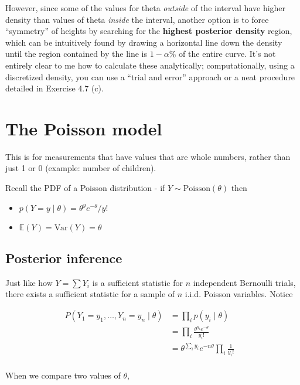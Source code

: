 \documentclass[
]{article}
\providecommand{\tightlist}{%
  \setlength{\itemsep}{0pt}\setlength{\parskip}{0pt}}
\begin{document}
However, since some of the values for theta \emph{outside} of the
interval have higher density than values of theta \emph{inside} the
interval, another option is to force ``symmetry'' of heights by
searching for the \textbf{highest posterior density} region, which can
be intuitively found by drawing a horizontal line down the density until
the region contained by the line is \(1 - \alpha\)\% of the entire
curve. It's not entirely clear to me how to calculate these
analytically; computationally, using a discretized density, you can use
a ``trial and error'' approach or a neat procedure detailed in Exercise
4.7 (c).

\hypertarget{the-poisson-model}{%
\section{The Poisson model}\label{the-poisson-model}}

This is for measurements that have values that are whole numbers, rather
than just 1 or 0 (example: number of children).

Recall the PDF of a Poisson distribution - if
\(Y \sim \text{Poisson}(\theta)\) then

\begin{itemize}
\tightlist
\item
  \(p(Y = y \mid \theta) = \theta^y e^{-\theta} / y!\)
\item
  \(\mathbb{E}(Y) = \text{Var}(Y) = \theta\)
\end{itemize}

\hypertarget{posterior-inference}{%
\subsection{Posterior inference}\label{posterior-inference}}

Just like how \(Y = \sum Y_i\) is a sufficient statistic for \(n\)
independent Bernoulli trials, there exists a sufficient statistic for a
sample of \(n\) i.i.d. Poisson variables. Notice

\begin{align}
P(Y_1 = y_1, \dots, Y_n = y_n \mid \theta) &=
\prod_i p(y_i \mid \theta) \\
&= \prod_i \frac{\theta^{y_i} e^{-\theta}}{y_i !} \\
&= \theta^{\sum_i y_i} e^{-n \theta} \prod_i \frac{1}{y_i !} & \\
\end{align}

When we compare two values of \(\theta\),
\end{document}
